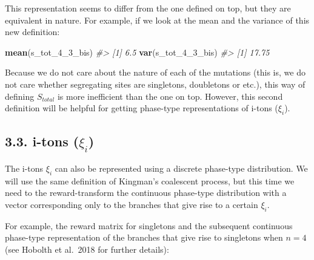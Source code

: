 \documentclass[]{article}
\newenvironment{Shaded}{\begin{snugshade}}{\end{snugshade}}
\newcommand{\CommentTok}[1]{\textcolor[rgb]{0.56,0.35,0.01}{\textit{#1}}}
\newcommand{\DecValTok}[1]{\textcolor[rgb]{0.00,0.00,0.81}{#1}}
\newcommand{\KeywordTok}[1]{\textcolor[rgb]{0.13,0.29,0.53}{\textbf{#1}}}
\newcommand{\NormalTok}[1]{#1}
\newcommand{\StringTok}[1]{\textcolor[rgb]{0.31,0.60,0.02}{#1}}
\begin{document}
This representation seems to differ from the one defined on top, but
they are equivalent in nature. For example, if we look at the mean and
the variance of this new definition:

\begin{Shaded}
\begin{Highlighting}[]
\KeywordTok{mean}\NormalTok{(s_tot_}\DecValTok{4}\NormalTok{_}\DecValTok{3}\NormalTok{_bis)}
\CommentTok{#> [1] 6.5}
\KeywordTok{var}\NormalTok{(s_tot_}\DecValTok{4}\NormalTok{_}\DecValTok{3}\NormalTok{_bis)}
\CommentTok{#> [1] 17.75}
\end{Highlighting}
\end{Shaded}

Because we do not care about the nature of each of the mutations (this
is, we do not care whether segregating sites are singletons, doubletons
or etc.), this way of defining \(S_{total}\) is more inefficient than
the one on top. However, this second definition will be helpful for
getting phase-type representations of i-tons (\(\xi_i\)).

\hypertarget{i-tons-xi_i}{%
\subsection{\texorpdfstring{3.3. i-tons
(\(\xi_i\))}{3.3. i-tons (\textbackslash{}xi\_i)}}\label{i-tons-xi_i}}

The i-tons \(\xi_i\) can also be represented using a discrete phase-type
distribution. We will use the same definition of Kingman's coalescent
process, but this time we need to the reward-transform the continuous
phase-type distribution with a vector corresponding only to the branches
that give rise to a certain \(\xi_i\).

For example, the reward matrix for singletons and the subsequent
continuous phase-type representation of the branches that give rise to
singletons when \(n=4\) (see Hobolth et al.~2018 for further details):

\begin{Shaded}
\end{Shaded}
\end{document}
